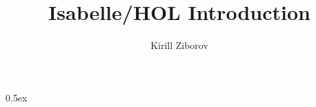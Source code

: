 \documentclass[11pt,a4paper]{article}
\begin{document}
\title{Isabelle/HOL Introduction}
\author{Kirill Ziborov}
\maketitle

\tableofcontents\newpage

\parindent 0pt\parskip 0.5ex



%
%
\end{document}

